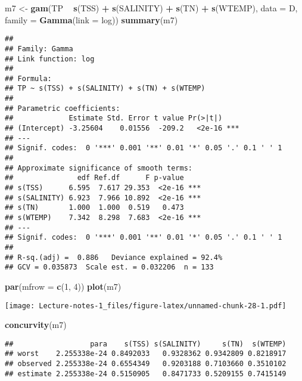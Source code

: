 \documentclass[
]{book}
\newenvironment{Shaded}{\begin{snugshade}}{\end{snugshade}}
\newcommand{\DataTypeTok}[1]{\textcolor[rgb]{0.13,0.29,0.53}{#1}}
\newcommand{\DecValTok}[1]{\textcolor[rgb]{0.00,0.00,0.81}{#1}}
\newcommand{\KeywordTok}[1]{\textcolor[rgb]{0.13,0.29,0.53}{\textbf{#1}}}
\newcommand{\NormalTok}[1]{#1}
\newcommand{\OperatorTok}[1]{\textcolor[rgb]{0.81,0.36,0.00}{\textbf{#1}}}
\newcommand{\StringTok}[1]{\textcolor[rgb]{0.31,0.60,0.02}{#1}}
\begin{document}
\begin{Shaded}
\begin{Highlighting}[]
\NormalTok{m7 <-}\StringTok{ }\KeywordTok{gam}\NormalTok{(TP }\OperatorTok{~}\StringTok{ }\KeywordTok{s}\NormalTok{(TSS) }\OperatorTok{+}\StringTok{ }\KeywordTok{s}\NormalTok{(SALINITY) }\OperatorTok{+}\StringTok{ }\KeywordTok{s}\NormalTok{(TN) }\OperatorTok{+}\StringTok{ }\KeywordTok{s}\NormalTok{(WTEMP), }
          \DataTypeTok{data =}\NormalTok{ D, }\DataTypeTok{family =} \KeywordTok{Gamma}\NormalTok{(}\DataTypeTok{link =}\NormalTok{ log))}
\KeywordTok{summary}\NormalTok{(m7)}
\end{Highlighting}
\end{Shaded}

\begin{verbatim}
## 
## Family: Gamma 
## Link function: log 
## 
## Formula:
## TP ~ s(TSS) + s(SALINITY) + s(TN) + s(WTEMP)
## 
## Parametric coefficients:
##             Estimate Std. Error t value Pr(>|t|)    
## (Intercept) -3.25604    0.01556  -209.2   <2e-16 ***
## ---
## Signif. codes:  0 '***' 0.001 '**' 0.01 '*' 0.05 '.' 0.1 ' ' 1
## 
## Approximate significance of smooth terms:
##               edf Ref.df      F p-value    
## s(TSS)      6.595  7.617 29.353  <2e-16 ***
## s(SALINITY) 6.923  7.966 10.892  <2e-16 ***
## s(TN)       1.000  1.000  0.519   0.473    
## s(WTEMP)    7.342  8.298  7.683  <2e-16 ***
## ---
## Signif. codes:  0 '***' 0.001 '**' 0.01 '*' 0.05 '.' 0.1 ' ' 1
## 
## R-sq.(adj) =  0.886   Deviance explained = 92.4%
## GCV = 0.035873  Scale est. = 0.032206  n = 133
\end{verbatim}

\begin{Shaded}
\begin{Highlighting}[]
\KeywordTok{par}\NormalTok{(}\DataTypeTok{mfrow =} \KeywordTok{c}\NormalTok{(}\DecValTok{1}\NormalTok{, }\DecValTok{4}\NormalTok{))}
\KeywordTok{plot}\NormalTok{(m7)}
\end{Highlighting}
\end{Shaded}

\texttt{[image: Lecture-notes-1\_files/figure-latex/unnamed-chunk-28-1.pdf]}

\begin{Shaded}
\begin{Highlighting}[]
\KeywordTok{concurvity}\NormalTok{(m7)}
\end{Highlighting}
\end{Shaded}

\begin{verbatim}
##                  para    s(TSS) s(SALINITY)     s(TN)  s(WTEMP)
## worst    2.255338e-24 0.8492033   0.9328362 0.9342809 0.8218917
## observed 2.255338e-24 0.6554349   0.9203188 0.7103660 0.3510102
## estimate 2.255338e-24 0.5150905   0.8471733 0.5209155 0.7415149
\end{verbatim}
\end{document}
